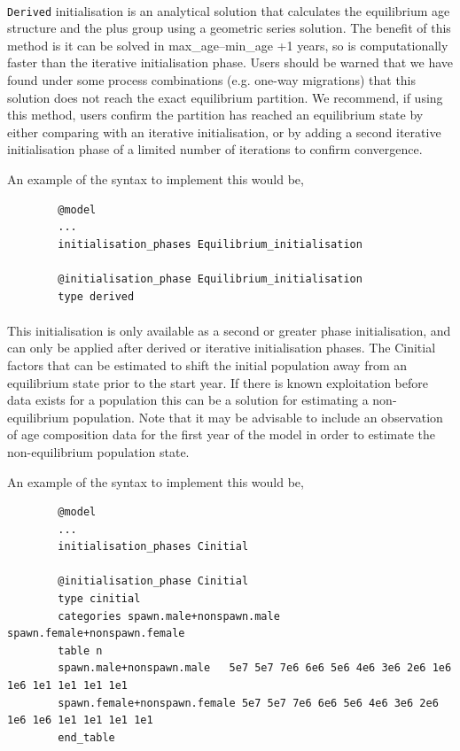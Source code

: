 \paragraph{}

\texttt{Derived} initialisation is an analytical solution that calculates the equilibrium age structure and the plus group using a geometric series solution. The benefit of this method is it can be solved in max\_age--min\_age +1 years, so is computationally faster than the iterative initialisation phase. Users should be warned that we have found under some process combinations (e.g. one-way migrations) that this solution does not reach the exact equilibrium partition. We recommend, if using this method, users confirm the partition has reached an equilibrium state by either comparing with an iterative initialisation, or by adding a second iterative initialisation phase of a limited number of iterations to confirm convergence.

An example of the syntax to implement this would be,
{\small{\begin{verbatim}
		@model
		...
		initialisation_phases Equilibrium_initialisation

		@initialisation_phase Equilibrium_initialisation
		type derived
		\end{verbatim}}}

\paragraph{}

This initialisation is only available as a second or greater phase initialisation, and can only be applied after derived or iterative initialisation phases. The Cinitial factors that can be estimated to shift the initial population away from an equilibrium state prior to the start year. If there is known exploitation before data exists for a population this can be a solution for estimating a non-equilibrium population. Note that it may be advisable to include an observation of age composition data for the first year of the model in order to estimate the non-equilibrium population state.

An example of the syntax to implement this would be,

{\small{\begin{verbatim}
		@model
		...
		initialisation_phases Cinitial

		@initialisation_phase Cinitial
		type cinitial
		categories spawn.male+nonspawn.male 	spawn.female+nonspawn.female
		table n
		spawn.male+nonspawn.male   5e7 5e7 7e6 6e6 5e6 4e6 3e6 2e6 1e6 1e6 1e1 1e1 1e1 1e1
		spawn.female+nonspawn.female 5e7 5e7 7e6 6e6 5e6 4e6 3e6 2e6 1e6 1e6 1e1 1e1 1e1 1e1
		end_table
		\end{verbatim}}}

